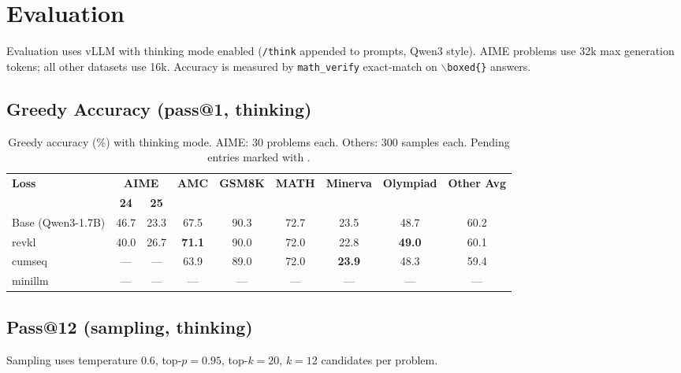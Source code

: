 \documentclass[11pt]{article}
\begin{document}
\section{Evaluation}

Evaluation uses vLLM with thinking mode enabled (\texttt{/think} appended to prompts, Qwen3 style). AIME problems use 32k max generation tokens; all other datasets use 16k. Accuracy is measured by \texttt{math\_verify} exact-match on $\backslash$\texttt{boxed\{\}} answers.

\subsection{Greedy Accuracy (pass@1, thinking)}

\begin{table}[h]
\centering
\caption{Greedy accuracy (\%) with thinking mode. AIME: 30 problems each. Others: 300 samples each. Pending entries marked with \textemdash.}
\label{tab:greedy}
\begin{tabular}{lcccccccc}
\toprule
\multirow{2}{*}{\textbf{Loss}} & \multicolumn{2}{c}{\textbf{AIME}} & \multirow{2}{*}{\textbf{AMC}} & \multirow{2}{*}{\textbf{GSM8K}} & \multirow{2}{*}{\textbf{MATH}} & \multirow{2}{*}{\textbf{Minerva}} & \multirow{2}{*}{\textbf{Olympiad}} & \multirow{2}{*}{\textbf{Other Avg}} \\
\cmidrule(lr){2-3}
 & \textbf{24} & \textbf{25} & & & & & & \\
\midrule
Base (Qwen3-1.7B) & 46.7 & 23.3 & 67.5 & 90.3 & 72.7 & 23.5 & 48.7 & 60.2 \\
\midrule
revkl             & 40.0 & 26.7 & \textbf{71.1} & 90.0 & 72.0 & 22.8 & \textbf{49.0} & 60.1 \\
cumseq            & --- & --- & 63.9 & 89.0 & 72.0 & \textbf{23.9} & 48.3 & 59.4 \\
minillm           & --- & --- & --- & --- & --- & --- & --- & --- \\
\bottomrule
\end{tabular}
\end{table}

\subsection{Pass@12 (sampling, thinking)}

Sampling uses temperature $0.6$, top-$p = 0.95$, top-$k = 20$, $k=12$ candidates per problem.
\end{document}
